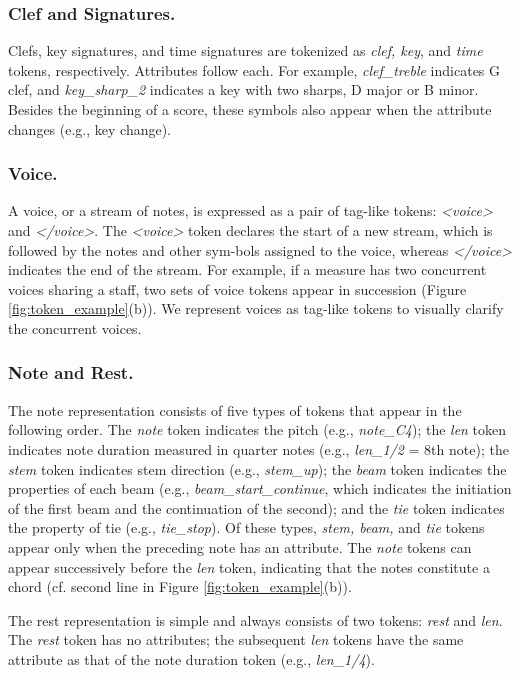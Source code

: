 \documentclass[sigconf]{acmart} %
\begin{document}
\subsubsection{Clef and Signatures.}
Clefs, key signatures, and time signatures are tokenized as \textit{clef, key}, and \textit{time} tokens, respectively. Attributes follow each. For example, \textit{clef\_treble} indicates G clef, and \textit{key\_sharp\_2} indicates a key with two sharps, D major or B minor. Besides the beginning of a score, these symbols also appear when the attribute changes (e.g., key change). 

\subsubsection{Voice.}
\label{sec:voice}
A voice, or a stream of notes, is expressed as a pair of tag-like tokens: \textit{<voice>} and \textit{</voice>}. The \textit{<voice>} token declares the start of a new stream, which is followed by the notes and other sym-bols assigned to the voice, whereas \textit{</voice>} indicates the end of the stream. For example, if a measure has two concurrent voices sharing a staff, two sets of voice tokens appear in succession (Figure \ref{fig:token_example}(b)). We represent voices as tag-like tokens to visually clarify the concurrent voices.

\subsubsection{Note and Rest.}
The note representation consists of five types of tokens that appear in the following order. The \textit{note} token indicates the pitch (e.g., \textit{note\_C4}); the \textit{len} token indicates note duration measured in quarter notes (e.g., \textit{len\_1/2} = 8th note); the \textit{stem} token indicates stem direction (e.g., \textit{stem\_up}); the \textit{beam} token indicates the properties of each beam (e.g., \textit{beam\_start\_continue}, which indicates the initiation of the first beam and the continuation of the second); and the \textit{tie} token indicates the property of tie (e.g., \textit{tie\_stop}). Of these types, \textit{stem, beam,} and \textit{tie} tokens appear only when the preceding note has an attribute. The \textit{note} tokens can appear successively before the \textit{len} token, indicating that the notes constitute a chord (cf. second line in Figure \ref{fig:token_example}(b)).

The rest representation is simple and always consists of two tokens: \textit{rest} and \textit{len}. The \textit{rest} token has no attributes; the subsequent \textit{len} tokens have the same attribute as that of the note duration token (e.g., \textit{len\_1/4}).
\end{document}
